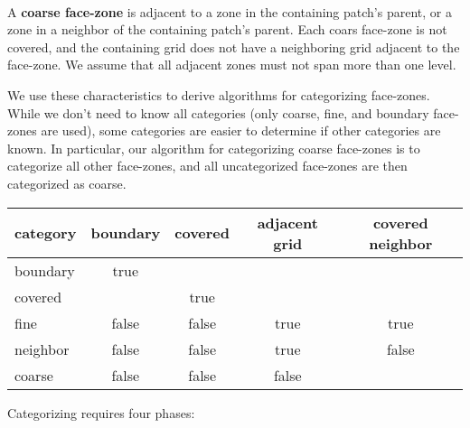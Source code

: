 \documentclass[10pt]{article}
\begin{document}
\begin{minipage}{1in}
\end{minipage} \
\begin{minipage}{5.8in}
A \textbf{coarse face-zone} is adjacent to a zone in the containing
patch's parent, or a zone in a neighbor of the containing patch's
parent.  Each coars face-zone is not covered, and the containing grid
does not have a neighboring grid adjacent to the face-zone.
We assume that all adjacent zones must not span more than one level.
\end{minipage}


We use these characteristics to derive algorithms for categorizing
face-zones.  While we don't need to know all categories (only coarse,
fine, and boundary face-zones are used), some categories are easier to
determine if other categories are known.  In particular, our algorithm
for categorizing coarse face-zones is to categorize all other
face-zones, and all uncategorized face-zones are then categorized as
coarse.

\begin{center}
\begin{tabular}{l|cccc}
category & boundary & covered & adjacent grid & covered neighbor \\ \hline
boundary & true &  \\
covered  &        & true \\
fine     & false & false & true & true \\
neighbor & false & false  & true& false \\
coarse   & false & false  & false \\
\end{tabular}
\end{center}

Categorizing requires four phases:
\end{document}
